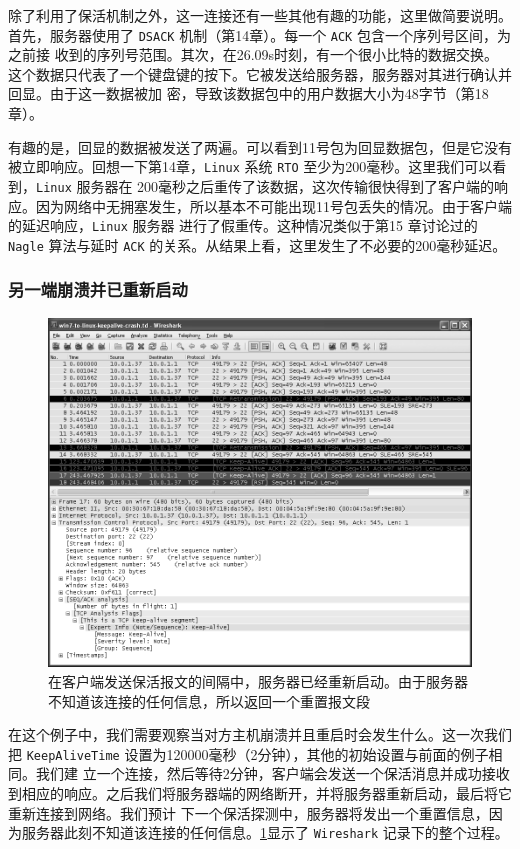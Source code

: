 除了利用了保活机制之外，这一连接还有一些其他有趣的功能，这里做简要说明。首先，服务器使用了 \verb|DSACK| 机制（第14章）。每一个 \verb|ACK| 包含一个序列号区间，为之前接
收到的序列号范围。其次，在26.09s时刻，有一个很小比特的数据交换。这个数据只代表了一个键盘键的按下。它被发送给服务器，服务器对其进行确认并回显。由于这一数据被加
密，导致该数据包中的用户数据大小为48字节（第18章）。

有趣的是，回显的数据被发送了两遍。可以看到11号包为回显数据包，但是它没有被立即响应。回想一下第14章，\verb|Linux| 系统 \verb|RTO| 至少为200毫秒。这里我们可以看到，\verb|Linux|
服务器在 200毫秒之后重传了该数据，这次传输很快得到了客户端的响应。因为网络中无拥塞发生，所以基本不可能出现11号包丢失的情况。由于客户端的延迟响应，\verb|Linux| 服务器
进行了假重传。这种情况类似于第15 章讨论过的 \verb|Nagle| 算法与延时 \verb|ACK| 的关系。从结果上看，这里发生了不必要的200毫秒延迟。

\subsubsection{另一端崩溃并已重新启动}

\begin{figure}[!htb]
    \centering
	\includegraphics[width=1\textwidth]{imgs/17/17-2.png}
	\caption{在客户端发送保活报文的间隔中，服务器已经重新启动。由于服务器不知道该连接的任何信息，所以返回一个重置报文段}
    \label{fig:17-2}
\end{figure}

在这个例子中，我们需要观察当对方主机崩溃并且重启时会发生什么。这一次我们把 \verb|KeepAliveTime| 设置为120000毫秒（2分钟），其他的初始设置与前面的例子相同。我们建
立一个连接，然后等待2分钟，客户端会发送一个保活消息并成功接收到相应的响应。之后我们将服务器端的网络断开，并将服务器重新启动，最后将它重新连接到网络。我们预计
下一个保活探测中，服务器将发出一个重置信息，因为服务器此刻不知道该连接的任何信息。\ref{fig:17-2}显示了 \verb|Wireshark| 记录下的整个过程。


